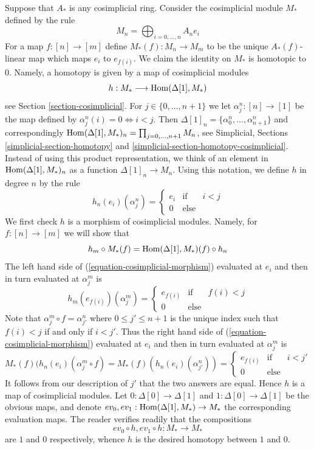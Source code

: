 \begin{example}
\label{example-cosimplicial-module}
Suppose that $A_*$ is any cosimplicial ring.
Consider the cosimplicial module $M_*$ defined by the rule
$$
M_n = \bigoplus\nolimits_{i = 0, ..., n} A_n e_i
$$
For a map $f : [n] \to [m]$ define $M_*(f) : M_n \to M_m$
to be the unique $A_*(f)$-linear map which maps $e_i$ to $e_{f(i)}$.
We claim the identity on $M_*$ is homotopic to $0$.
Namely, a homotopy is given by a map of cosimplicial modules
$$
h : M_* \longrightarrow \mathop{\mathrm{Hom}}\nolimits(\Delta[1], M_*)
$$
see Section \ref{section-cosimplicial}.
For $j \in \{0, \ldots, n + 1\}$ we let $\alpha^n_j : [n] \to [1]$ be the map
defined by $\alpha^n_j(i) = 0 \Leftrightarrow i < j$. Then
$\Delta[1]_n = \{\alpha^n_0, \ldots, \alpha^n_{n + 1}\}$ and correspondingly
$\mathop{\mathrm{Hom}}\nolimits(\Delta[1], M_*)_n = \prod_{j = 0, \ldots, n + 1} M_n$, see
Simplicial, Sections \ref{simplicial-section-homotopy} and
\ref{simplicial-section-homotopy-cosimplicial}. Instead of using
this product representation, we think of an element
in $\mathop{\mathrm{Hom}}\nolimits(\Delta[1], M_*)_n$ as a function $\Delta[1]_n \to M_n$.
Using this notation, we define $h$ in degree $n$ by the rule
$$
h_n(e_i)(\alpha^n_j) =
\left\{
\begin{matrix}
e_{i} & \text{if} & i < j \\
0 & \text{else} 
\end{matrix}
\right.
$$
We first check $h$ is a morphism of cosimplicial modules. Namely, for
$f : [n] \to [m]$ we will show that
\begin{equation}
\label{equation-cosimplicial-morphism}
h_m \circ M_*(f) = \mathop{\mathrm{Hom}}\nolimits(\Delta[1], M_*)(f) \circ h_n
\end{equation}
The left hand side of (\ref{equation-cosimplicial-morphism}) evaluated at
$e_i$ and then in turn evaluated at $\alpha^m_j$ is
$$
h_m(e_{f(i)})(\alpha^m_j) =
\left\{
\begin{matrix}
e_{f(i)} & \text{if} & f(i) < j \\
0 & \text{else}
\end{matrix}
\right.
$$
Note that $\alpha^m_j \circ f = \alpha^n_{j'}$ where
$0 \leq j' \leq n + 1$ is the unique index such that $f(i) < j$
if and only if $i < j'$. Thus the right hand side of
(\ref{equation-cosimplicial-morphism}) evaluated at $e_i$
and then in turn evaluated at $\alpha^m_j$ is
$$
M_*(f)(h_n(e_i)(\alpha^m_j \circ f) =
M_*(f)(h_n(e_i)(\alpha^n_{j'})) =
\left\{
\begin{matrix}
e_{f(i)} & \text{if} & i < j' \\
0 & \text{else} 
\end{matrix}
\right.
$$
It follows from our description of $j'$ that the two answers are equal.
Hence $h$ is a map of cosimplicial modules.
Let $0 : \Delta[0] \to \Delta[1]$ and
$1 : \Delta[0] \to \Delta[1]$ be the obvious maps, and denote
$ev_0, ev_1 : \mathop{\mathrm{Hom}}\nolimits(\Delta[1], M_*) \to M_*$ the corresponding
evaluation maps. The reader verifies readily that
the compositions
$$
ev_0 \circ h, ev_1 \circ h : M_* \longrightarrow M_*
$$
are $1$ and $0$ respectively, whence $h$ is the desired homotopy between
$1$ and $0$.
\end{example}

